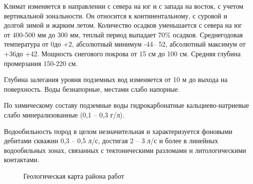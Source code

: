 \documentclass[a4paper,12pt]{article} %
\begin{document}
Климат изменяется в направлении с севера на юг и с запада на восток, с учетом вертикальной зональности. Он относится к континентальному, с суровой и долгой зимой и жарким летом. Количество осадков уменьшается с севера на юг от 400-500 мм до 300 мм, теплый период выпадает 70\% осадков. Среднегодовая температура от 0\degree до +2, абсолютный минимум -44 -- 52, абсолютный максимум  от +36 до +42. Мощность снегового покрова от 15 см до 100 см. Средняя глубина промерзания 150-220 см.

Глубина залегания уровня подземных вод изменяется от 10 м до выхода на поверхность. Воды безнапорные, местами слабо напорные.

По химическому составу подземные воды гидрокарбонатные кальциево-натриевые слабо минерализованные (0,1 -- 0,3 г/л).

Водообильность пород в целом незначительная и характеризуется фоновыми дебитами скважин 0,3 -- 0,5 л/с, достигая 2 -- 3 л/с и более в линейных водообильных зонах, связанных с тектоническими разломами и литологическими контактами.

\begin{figure}[h]
	\caption{Геологическая карта района работ}
\end{figure}
\end{document}
